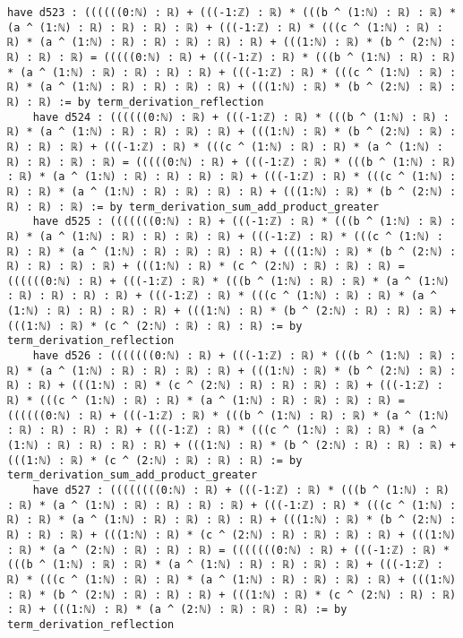 \documentclass{article}
\begin{document}
\begin{tcolorbox}[colback=white!10, width=\linewidth]
\begin{lstlisting}[language=Lean4]
    have d523 : ((((((0:ℕ) : ℝ) + (((-1:ℤ) : ℝ) * (((b ^ (1:ℕ) : ℝ) : ℝ) * (a ^ (1:ℕ) : ℝ) : ℝ) : ℝ) : ℝ) + (((-1:ℤ) : ℝ) * (((c ^ (1:ℕ) : ℝ) : ℝ) * (a ^ (1:ℕ) : ℝ) : ℝ) : ℝ) : ℝ) : ℝ) + (((1:ℕ) : ℝ) * (b ^ (2:ℕ) : ℝ) : ℝ) : ℝ) = (((((0:ℕ) : ℝ) + (((-1:ℤ) : ℝ) * (((b ^ (1:ℕ) : ℝ) : ℝ) * (a ^ (1:ℕ) : ℝ) : ℝ) : ℝ) : ℝ) + (((-1:ℤ) : ℝ) * (((c ^ (1:ℕ) : ℝ) : ℝ) * (a ^ (1:ℕ) : ℝ) : ℝ) : ℝ) : ℝ) + (((1:ℕ) : ℝ) * (b ^ (2:ℕ) : ℝ) : ℝ) : ℝ) := by term_derivation_reflection
    have d524 : ((((((0:ℕ) : ℝ) + (((-1:ℤ) : ℝ) * (((b ^ (1:ℕ) : ℝ) : ℝ) * (a ^ (1:ℕ) : ℝ) : ℝ) : ℝ) : ℝ) + (((1:ℕ) : ℝ) * (b ^ (2:ℕ) : ℝ) : ℝ) : ℝ) : ℝ) + (((-1:ℤ) : ℝ) * (((c ^ (1:ℕ) : ℝ) : ℝ) * (a ^ (1:ℕ) : ℝ) : ℝ) : ℝ) : ℝ) = (((((0:ℕ) : ℝ) + (((-1:ℤ) : ℝ) * (((b ^ (1:ℕ) : ℝ) : ℝ) * (a ^ (1:ℕ) : ℝ) : ℝ) : ℝ) : ℝ) + (((-1:ℤ) : ℝ) * (((c ^ (1:ℕ) : ℝ) : ℝ) * (a ^ (1:ℕ) : ℝ) : ℝ) : ℝ) : ℝ) + (((1:ℕ) : ℝ) * (b ^ (2:ℕ) : ℝ) : ℝ) : ℝ) := by term_derivation_sum_add_product_greater
    have d525 : (((((((0:ℕ) : ℝ) + (((-1:ℤ) : ℝ) * (((b ^ (1:ℕ) : ℝ) : ℝ) * (a ^ (1:ℕ) : ℝ) : ℝ) : ℝ) : ℝ) + (((-1:ℤ) : ℝ) * (((c ^ (1:ℕ) : ℝ) : ℝ) * (a ^ (1:ℕ) : ℝ) : ℝ) : ℝ) : ℝ) + (((1:ℕ) : ℝ) * (b ^ (2:ℕ) : ℝ) : ℝ) : ℝ) : ℝ) + (((1:ℕ) : ℝ) * (c ^ (2:ℕ) : ℝ) : ℝ) : ℝ) = ((((((0:ℕ) : ℝ) + (((-1:ℤ) : ℝ) * (((b ^ (1:ℕ) : ℝ) : ℝ) * (a ^ (1:ℕ) : ℝ) : ℝ) : ℝ) : ℝ) + (((-1:ℤ) : ℝ) * (((c ^ (1:ℕ) : ℝ) : ℝ) * (a ^ (1:ℕ) : ℝ) : ℝ) : ℝ) : ℝ) + (((1:ℕ) : ℝ) * (b ^ (2:ℕ) : ℝ) : ℝ) : ℝ) + (((1:ℕ) : ℝ) * (c ^ (2:ℕ) : ℝ) : ℝ) : ℝ) := by term_derivation_reflection
    have d526 : (((((((0:ℕ) : ℝ) + (((-1:ℤ) : ℝ) * (((b ^ (1:ℕ) : ℝ) : ℝ) * (a ^ (1:ℕ) : ℝ) : ℝ) : ℝ) : ℝ) + (((1:ℕ) : ℝ) * (b ^ (2:ℕ) : ℝ) : ℝ) : ℝ) + (((1:ℕ) : ℝ) * (c ^ (2:ℕ) : ℝ) : ℝ) : ℝ) : ℝ) + (((-1:ℤ) : ℝ) * (((c ^ (1:ℕ) : ℝ) : ℝ) * (a ^ (1:ℕ) : ℝ) : ℝ) : ℝ) : ℝ) = ((((((0:ℕ) : ℝ) + (((-1:ℤ) : ℝ) * (((b ^ (1:ℕ) : ℝ) : ℝ) * (a ^ (1:ℕ) : ℝ) : ℝ) : ℝ) : ℝ) + (((-1:ℤ) : ℝ) * (((c ^ (1:ℕ) : ℝ) : ℝ) * (a ^ (1:ℕ) : ℝ) : ℝ) : ℝ) : ℝ) + (((1:ℕ) : ℝ) * (b ^ (2:ℕ) : ℝ) : ℝ) : ℝ) + (((1:ℕ) : ℝ) * (c ^ (2:ℕ) : ℝ) : ℝ) : ℝ) := by term_derivation_sum_add_product_greater
    have d527 : ((((((((0:ℕ) : ℝ) + (((-1:ℤ) : ℝ) * (((b ^ (1:ℕ) : ℝ) : ℝ) * (a ^ (1:ℕ) : ℝ) : ℝ) : ℝ) : ℝ) + (((-1:ℤ) : ℝ) * (((c ^ (1:ℕ) : ℝ) : ℝ) * (a ^ (1:ℕ) : ℝ) : ℝ) : ℝ) : ℝ) + (((1:ℕ) : ℝ) * (b ^ (2:ℕ) : ℝ) : ℝ) : ℝ) + (((1:ℕ) : ℝ) * (c ^ (2:ℕ) : ℝ) : ℝ) : ℝ) : ℝ) + (((1:ℕ) : ℝ) * (a ^ (2:ℕ) : ℝ) : ℝ) : ℝ) = (((((((0:ℕ) : ℝ) + (((-1:ℤ) : ℝ) * (((b ^ (1:ℕ) : ℝ) : ℝ) * (a ^ (1:ℕ) : ℝ) : ℝ) : ℝ) : ℝ) + (((-1:ℤ) : ℝ) * (((c ^ (1:ℕ) : ℝ) : ℝ) * (a ^ (1:ℕ) : ℝ) : ℝ) : ℝ) : ℝ) + (((1:ℕ) : ℝ) * (b ^ (2:ℕ) : ℝ) : ℝ) : ℝ) + (((1:ℕ) : ℝ) * (c ^ (2:ℕ) : ℝ) : ℝ) : ℝ) + (((1:ℕ) : ℝ) * (a ^ (2:ℕ) : ℝ) : ℝ) : ℝ) := by term_derivation_reflection

\end{lstlisting}
\end{tcolorbox}
\end{document}
